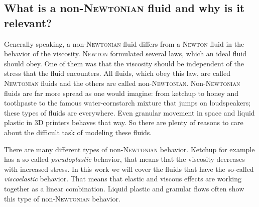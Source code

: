 \documentclass[12pt,a4paper,twoside, open=right]{scrreprt}
\theoremstyle{definition}
\theoremstyle{plain}
\begin{document}
\subsection{What is a non-\textsc{Newtonian} fluid and why is it relevant?}
Generally speaking, a non-\textsc{Newtonian} fluid differs from a \textsc{Newton} fluid in the behavior of the viscosity. \textsc{Newton} formulated several laws, which an ideal fluid should obey. One of them was that the viscosity should be independent of the stress that the fluid encounters. All fluids, which obey this law, are called \textsc{Newtonian} fluids and the others are called non-\textsc{Newtonian}. Non-\textsc{Newtonian} fluids are far more spread as one would imagine: from ketchup to honey and toothpaste to the famous water-cornstarch mixture that jumps on loudspeakers; these types of fluids are everywhere. Even granular movement in space and liquid plastic in 3D printers behaves that way. So there are plenty of reasons to care about the difficult task of modeling these fluids. \par 
There are many different types of non-\textsc{Newtonian} behavior. Ketchup for example has a so called \emph{pseudoplastic} behavior, that means that the viscosity decreases with increased stress. In this work we will cover the fluids that have the so-called \emph{viscoelastic} behavior. That means that elastic and viscous effects are working together as a linear combination. Liquid plastic and granular flows often show this type of non-\textsc{Newtonian} behavior.
\end{document}

